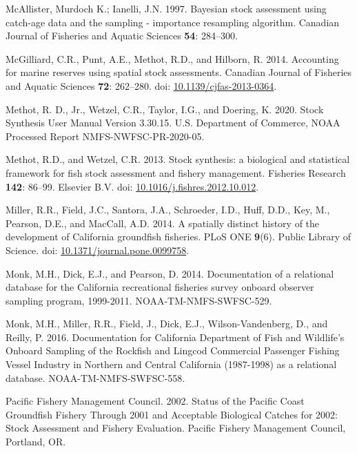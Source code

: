 \documentclass[
  english,
  a4paper,
]{article}
\newlength{\cslhangindent}
\newlength{\cslentryspacingunit} %
\newenvironment{CSLReferences}[2] %
 {%
  \setlength{\parindent}{0pt}
  \ifodd #1
  \let\oldpar\par
  \def\par{\hangindent=\cslhangindent\oldpar}
  \fi
  \setlength{\parskip}{#2\cslentryspacingunit}
 }%
 {}
\begin{document}
\begin{CSLReferences}{1}{0}
\leavevmode{}%
McAllister, Murdoch K.; Ianelli, J.N. 1997. {Bayesian stock assessment using catch-age data and the sampling - importance resampling algorithm}. Canadian Journal of Fisheries and Aquatic Sciences \textbf{54}: 284--300.

\leavevmode{}%
McGilliard, C.R., Punt, A.E., Methot, R.D., and Hilborn, R. 2014. {Accounting for marine reserves using spatial stock assessments}. Canadian Journal of Fisheries and Aquatic Sciences \textbf{72}: 262--280. doi: \href{https://doi.org/10.1139/cjfas-2013-0364}{10.1139/cjfas-2013-0364}.

\leavevmode{}%
Methot, R. D., Jr., Wetzel, C.R., Taylor, I.G., and Doering, K. 2020. {Stock Synthesis User Manual Version 3.30.15}. U.S. Department of Commerce, NOAA Processed Report NMFS-NWFSC-PR-2020-05.

\leavevmode{}%
Methot, R.D., and Wetzel, C.R. 2013. {Stock synthesis: a biological and statistical framework for fish stock assessment and fishery management}. Fisheries Research \textbf{142}: 86--99. Elsevier B.V. doi: \href{https://doi.org/10.1016/j.fishres.2012.10.012}{10.1016/j.fishres.2012.10.012}.

\leavevmode{}%
Miller, R.R., Field, J.C., Santora, J.A., Schroeder, I.D., Huff, D.D., Key, M., Pearson, D.E., and MacCall, A.D. 2014. {A spatially distinct history of the development of California groundfish fisheries}. PLoS ONE \textbf{9}(6). Public Library of Science. doi: \href{https://doi.org/10.1371/journal.pone.0099758}{10.1371/journal.pone.0099758}.

\leavevmode{}%
Monk, M.H., Dick, E.J., and Pearson, D. 2014. {Documentation of a relational database for the California recreational fisheries survey onboard observer sampling program, 1999-2011}. NOAA-TM-NMFS-SWFSC-529.

\leavevmode{}%
Monk, M.H., Miller, R.R., Field, J., Dick, E.J., Wilson-Vandenberg, D., and Reilly, P. 2016. {Documentation for California Department of Fish and Wildlife's Onboard Sampling of the Rockfish and Lingcod Commercial Passenger Fishing Vessel Industry in Northern and Central California (1987-1998) as a relational database}. NOAA-TM-NMFS-SWFSC-558.

\leavevmode{}%
Pacific Fishery Management Council. 2002. {Status of the Pacific Coast Groundfish Fishery Through 2001 and Acceptable Biological Catches for 2002: Stock Assessment and Fishery Evaluation.} Pacific Fishery Management Council, Portland, OR.


\end{CSLReferences}
\end{document}
